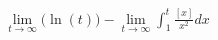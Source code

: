 \documentclass[preview]{standalone}
\begin{document}
\begin{align*}
\lim_{t\to\infty} \bigg(\ln(t)\bigg)- \lim_{t\to\infty}\int_{1}^{t}\frac{[x]}{x^2}dx
\end{align*}
\end{document}
